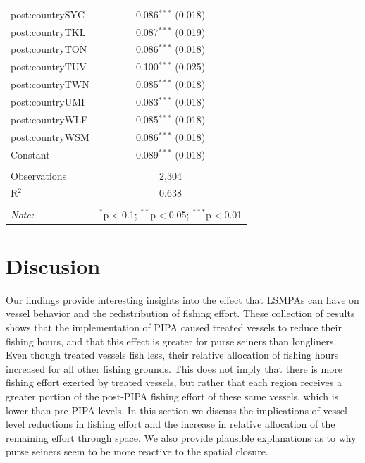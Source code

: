 \documentclass[12pt,]{article}
\begin{document}
\begin{table}[!htbp]
\begin{tabular}{@{\extracolsep{5pt}}lc}
  post:countrySYC & 0.086$^{***}$ (0.018) \\ 
  post:countryTKL & 0.087$^{***}$ (0.019) \\ 
  post:countryTON & 0.086$^{***}$ (0.018) \\ 
  post:countryTUV & 0.100$^{***}$ (0.025) \\ 
  post:countryTWN & 0.085$^{***}$ (0.018) \\ 
  post:countryUMI & 0.083$^{***}$ (0.018) \\ 
  post:countryWLF & 0.085$^{***}$ (0.018) \\ 
  post:countryWSM & 0.086$^{***}$ (0.018) \\ 
  Constant & 0.089$^{***}$ (0.018) \\ 
 \hline \\[-1.8ex] 
Observations & 2,304 \\ 
R$^{2}$ & 0.638 \\ 
\hline 
\hline \\[-1.8ex] 
\textit{Note:}  & \multicolumn{1}{r}{$^{*}$p$<$0.1; $^{**}$p$<$0.05; $^{***}$p$<$0.01} \\ 
\end{tabular} 
\end{table}

\clearpage

\hypertarget{discusion}{%
\section{Discusion}\label{discusion}}

Our findings provide interesting insights into the effect that LSMPAs
can have on vessel behavior and the redistribution of fishing effort.
These collection of results shows that the implementation of PIPA caused
treated vessels to reduce their fishing hours, and that this effect is
greater for purse seiners than longliners. Even though treated vessels
fish less, their relative allocation of fishing hours increased for all
other fishing grounds. This does not imply that there is more fishing
effort exerted by treated vessels, but rather that each region receives
a greater portion of the post-PIPA fishing effort of these same vessels,
which is lower than pre-PIPA levels. In this section we discuss the
implications of vessel-level reductions in fishing effort and the
increase in relative allocation of the remaining effort through space.
We also provide plausible explanations as to why purse seiners seem to
be more reactive to the spatial closure.
\end{document}
